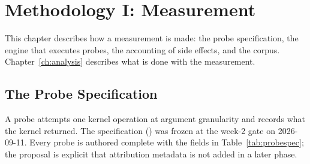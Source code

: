\chapter{Methodology I: Measurement}
\label{ch:engine}

This chapter describes how a measurement is made: the probe specification, the engine that executes probes, the accounting of side effects, and the corpus. Chapter~\ref{ch:analysis} describes what is done with the measurement.

\section{The Probe Specification}

A probe attempts one kernel operation at argument granularity and records what the kernel returned. The specification () was frozen at the week-2 gate on 2026-09-11. Every probe is authored complete with the fields in Table~\ref{tab:probespec}; the proposal is explicit that attribution metadata is not added in a later phase.

